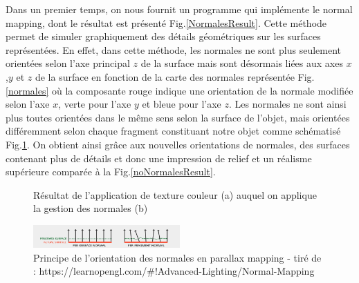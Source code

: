 \documentclass[a4paper]{article}
\begin{document}
Dans un premier temps, on nous fournit un programme qui implémente le normal mapping, dont le résultat est présenté Fig.\ref{NormalesResult}. Cette méthode permet de simuler graphiquement des détails géométriques sur les surfaces représentées. En effet, dans cette méthode, les normales ne sont plus seulement orientées selon l'axe principal $z$ de la surface mais sont désormais liées aux axes $x$,$y$ et $z$ de la surface en fonction de la carte des normales représentée Fig.\ref{normales} où la composante rouge indique une orientation de la normale modifiée selon l'axe $x$, verte pour l'axe $y$ et bleue pour l'axe $z$. Les normales ne sont ainsi plus toutes orientées dans le même sens selon la surface de l'objet, mais orientées différemment selon chaque fragment constituant notre objet comme schématisé Fig.\ref{normalFrag}. On obtient ainsi grâce aux nouvelles orientations de normales, des surfaces contenant plus de détails et donc une impression de relief et un réalisme supérieure comparée à la Fig.\ref{noNormalesResult}.


\begin{figure}[H]
\centering
{}
\caption{Résultat de l'application de texture couleur (a) auquel on applique la gestion des normales (b)}
\end{figure}

\begin{figure}[H]
\centering
\includegraphics[width=0.5\textwidth]{figures/normalsOrientation.png}
\caption{Principe de l'orientation des normales en parallax mapping - tiré de :  https://learnopengl.com/\#!Advanced-Lighting/Normal-Mapping}
\label{normalFrag}
\end{figure}
\end{document}
